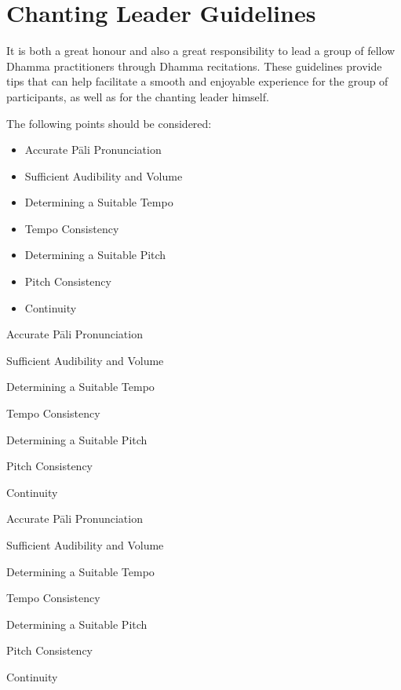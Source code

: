 
\section{Chanting Leader Guidelines}

  It is both a great honour and also a great responsibility to lead a group of fellow Dhamma practitioners through Dhamma recitations. These guidelines provide tips that can help facilitate a smooth and enjoyable experience for the group of participants, as well as for the chanting leader himself.

The following points should be considered:

\ifafiveversion
\begin{itemize}
  \item Accurate Pāli Pronunciation
  \item Sufficient Audibility and Volume
  \item Determining a Suitable Tempo
  \item Tempo Consistency
  \item Determining a Suitable Pitch
  \item Pitch Consistency
  \item Continuity
\end{itemize}
\fi

\ifasixversion
\begin{packeditemize}
  \item Accurate Pāli Pronunciation
  \item Sufficient Audibility and Volume
  \item Determining a Suitable Tempo
  \item Tempo Consistency
  \item Determining a Suitable Pitch
  \item Pitch Consistency
  \item Continuity
\end{packeditemize}
\fi

\ifbfiveversion
\begin{packeditemize}
  \item Accurate Pāli Pronunciation
  \item Sufficient Audibility and Volume
  \item Determining a Suitable Tempo
  \item Tempo Consistency
  \item Determining a Suitable Pitch
  \item Pitch Consistency
  \item Continuity
\end{packeditemize}
\fi

